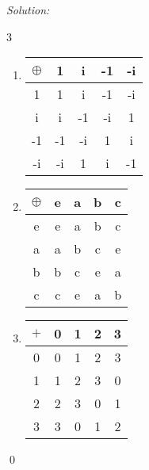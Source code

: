 \documentclass[12 pt]{article}
\newenvironment{problem}[2][Problem]{\begin{trivlist}
\item[\hskip \labelsep {\bfseries #1}\hskip \labelsep {\bfseries #2.}]}{\end{trivlist}}
\newenvironment{sol}
    {\emph{Solution:}
    }
    {
    \qed
    }
\theoremstyle{definition}
\begin{document}
\begin{problem}{4}
\begin{enumerate}[label=\alph*)]
\begin{sol}
\begin{multicols}{3}
\begin{enumerate}[label=]
    \item 
\renewcommand\arraystretch{1.5}
\setlength\doublerulesep{0pt}
\begin{tabular}{c||c c c c}
$\oplus$ & 1 & i & -1 & -i \\
\hline\hline
1 & 1 & i & -1& -i\\ 
\hline
i & i & -1 & -i & 1 \\ 
\hline
-1 & -1 & -i & 1 & i \\ 
\hline
-i & -i & 1 & i & -1 \\ 
\end{tabular}
    \item 
\renewcommand\arraystretch{1.5}
\setlength\doublerulesep{0pt}
\begin{tabular}{c||c c c c}
$\oplus$ & e & a & b & c \\
\hline\hline
e & e & a & b & c \\ 
\hline
a & a & b & c & e \\ 
\hline
b & b & c & e & a \\ 
\hline
c & c & e & a & b \\ 
\end{tabular}
\item \renewcommand\arraystretch{1.5}
\setlength\doublerulesep{0pt}
\begin{tabular}{c||c c c c}
$+$ & 0 & 1 & 2 & 3 \\
\hline\hline
0 & 0 & 1 & 2 & 3 \\ 
\hline
1 & 1 & 2 & 3 & 0 \\ 
\hline
2 & 2 & 3 & 0 & 1 \\ 
\hline
3 & 3 & 0 & 1 & 2 \\ 
\end{tabular}
\end{enumerate}
\end{multicols}



\end{sol}
\end{enumerate}

\end{problem}
\end{document}

